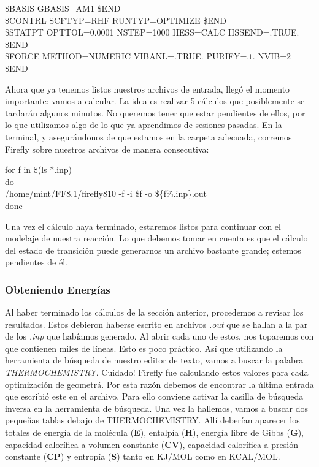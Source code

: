 \documentclass[10pt,letterpaper]{article}
\newenvironment{Code}
{
\begin{lrbox}{\selvestebox}%
\begin{minipage}{\dimexpr\columnwidth-2\fboxsep\relax}
\fontfamily{\ttdefault}\selectfont
}
{\end{minipage}\end{lrbox}%
\begin{center}
\colorbox{light-gray}{\usebox{\selvestebox}}
\end{center}
}
\begin{document}
\begin{Code}
\$BASIS GBASIS=AM1 \$END\\
\$CONTRL SCFTYP=RHF RUNTYP=OPTIMIZE \$END\\
\$STATPT OPTTOL=0.0001 NSTEP=1000 HESS=CALC HSSEND=.TRUE. \$END\\
\$FORCE METHOD=NUMERIC VIBANL=.TRUE. PURIFY=.t. NVIB=2 \$END
\end{Code}

Ahora que ya tenemos listos nuestros archivos de entrada, lleg\'o el momento importante: vamos a calcular. La idea es realizar 5 c\'alculos que posiblemente se tardar\'an algunos minutos. No queremos tener que estar pendientes de ellos, por lo que utilizamos algo de lo que ya aprendimos de sesiones pasadas. En la terminal, y asegur\'andonos de que estamos en la carpeta adecuada, corremos Firefly sobre nuestros archivos de manera consecutiva:

\begin{Code}
for f in \$(ls *.inp)\\
do\\
/home/mint/FF8.1/firefly810 -f -i \$f -o \$\big\{f\%.inp\big\}.out\\
done
\end{Code}

Una vez el c\'alculo haya terminado, estaremos listos para continuar con el modelaje de nuestra reacci\'on. Lo que debemos tomar en cuenta es que el c\'alculo del estado de transici\'on puede generarnos un archivo bastante grande; estemos pendientes de \'el.

\subsubsection{Obteniendo Energ\'ias}
Al haber terminado los c\'alculos de la secci\'on anterior, procedemos a revisar los resultados. Estos debieron haberse escrito en archivos \textit{.out} que se hallan a la par de los \textit{.inp} que hab\'iamos generado. Al abrir cada uno de estos, nos toparemos con que contienen miles de l\'ineas. Esto es poco pr\'actico. As\'i que utilizando la herramienta de b\'usqueda de nuestro editor de texto, vamos a buscar la palabra \textit{THERMOCHEMISTRY}. Cuidado! Firefly fue calculando estos valores para cada optimizaci\'on de geometr\'a. Por esta raz\'on debemos de encontrar la \'ultima entrada que escribi\'o este en el archivo. Para ello conviene activar la casilla de b\'usqueda inversa en la herramienta de b\'usqueda. Una vez la hallemos, vamos a buscar dos peque\~nas tablas debajo de THERMOCHEMISTRY. All\'i deber\'ian aparecer los totales de energ\'ia de la mol\'ecula (\textbf{E}), entalp\'ia (\textbf{H}), energ\'ia libre de Gibbs (\textbf{G}), capacidad calor\'ifica a volumen constante (\textbf{CV}), capacidad calor\'ifica a presi\'on constante (\textbf{CP}) y entrop\'ia (\textbf{S}) tanto en KJ/MOL como en KCAL/MOL.\\
\end{document}
